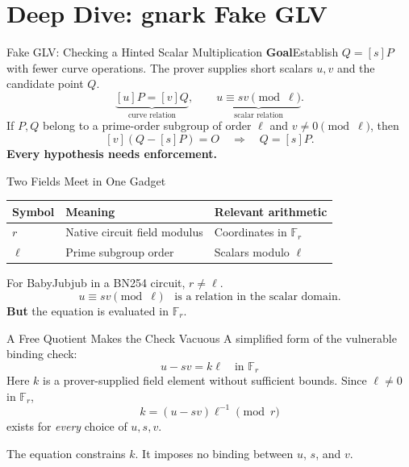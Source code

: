 \documentclass[aspectratio=169,11pt]{beamer}
\newcommand{\F}{\mathbb F}
\begin{document}
\section{Deep Dive: gnark Fake GLV}

\begin{frame}{Fake GLV: Checking a Hinted Scalar Multiplication}
\textbf{Goal}\quad Establish $Q=[s]P$ with fewer curve operations.
\vspace{3mm}
The prover supplies short scalars $u,v$ and the candidate point $Q$.
\[\underbrace{[u]P=[v]Q}_{\text{curve relation}},\qquad
\underbrace{u\equiv sv\pmod\ell}_{\text{scalar relation}}.\]
If $P,Q$ belong to a prime-order subgroup of order $\ell$ and $v\ne0\pmod\ell$, then
\[[v](Q-[s]P)=O\quad\Longrightarrow\quad Q=[s]P.\]
\textbf{Every hypothesis needs enforcement.}
\end{frame}

\begin{frame}{Two Fields Meet in One Gadget}
\begin{tabular}{lll}\toprule
Symbol & Meaning & Relevant arithmetic\\\midrule
$r$ & Native circuit field modulus & Coordinates in $\F_r$\\[2mm]
$\ell$ & Prime subgroup order & Scalars modulo $\ell$\\\bottomrule\end{tabular}\par
\vspace{5mm}
For BabyJubjub in a BN254 circuit, $r\ne\ell$.
\[u\equiv sv\pmod\ell\quad\text{is a relation in the scalar domain.}\]
\textbf{But} the equation is evaluated in $\mathbb F_r$.
\end{frame}

\begin{frame}{A Free Quotient Makes the Check Vacuous}
A simplified form of the vulnerable binding check:
\[\boxed{u-sv=k\ell\quad\text{in }\F_r}\]
Here $k$ is a prover-supplied field element without sufficient bounds.
Since $\ell\ne0$ in $\F_r$,
\[k=(u-sv)\ell^{-1}\pmod r\]
exists for \emph{every} choice of $u,s,v$.  

The equation constrains $k$. It imposes no binding between $u$, $s$, and $v$.
\end{frame}
\end{document}
